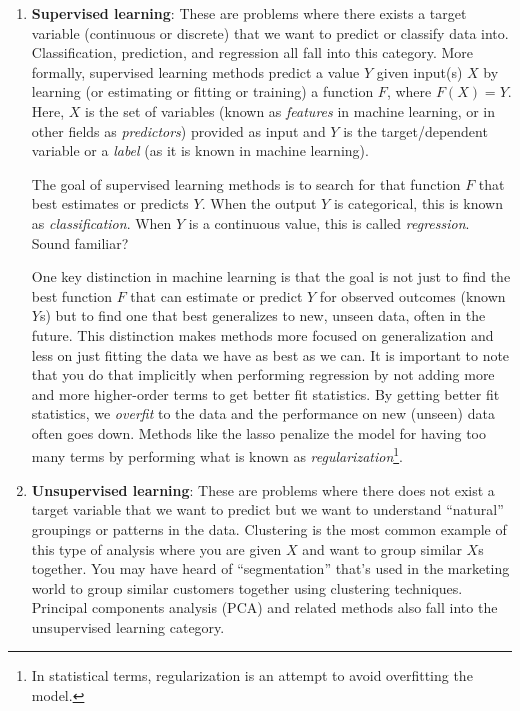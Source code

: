 \documentclass[]{krantz}
\begin{document}
\begin{enumerate}
\def\labelenumi{\arabic{enumi}.}
\item
  \textbf{Supervised learning}: These are problems where there exists a
  target variable (continuous or discrete) that we want to predict or
  classify data into. Classification, prediction, and regression all
  fall into this category. More formally, supervised learning methods
  predict a value \(Y\) given input(s) \(X\) by learning (or estimating
  or fitting or training) a function \(F\), where \(F(X) = Y\). Here,
  \(X\) is the set of variables (known as \emph{features} in machine
  learning, or in other fields as \emph{predictors}) provided as input
  and \(Y\) is the target/dependent variable or a \emph{label} (as it is
  known in machine learning).

  The goal of supervised learning methods is to search for that function
  \(F\) that best estimates or predicts \(Y\). When the output \(Y\) is
  categorical, this is known as \emph{classification}. When \(Y\) is a
  continuous value, this is called \emph{regression}. Sound familiar?

  One key distinction in machine learning is that the goal is not just
  to find the best function \(F\) that can estimate or predict \(Y\) for
  observed outcomes (known \(Y\)s) but to find one that best generalizes
  to new, unseen data, often in the future. This distinction makes
  methods more focused on generalization and less on just fitting the
  data we have as best as we can. It is important to note that you do
  that implicitly when performing regression by not adding more and more
  higher-order terms to get better fit statistics. By getting better fit
  statistics, we \emph{overfit} to the data and the performance on new
  (unseen) data often goes down. Methods like the lasso
  \citep{tibshirani1996regression} penalize the model for having too
  many terms by performing what is known as
  \emph{regularization}\footnote{In statistical terms, regularization is
    an attempt to avoid overfitting the model.}.
\item
  \textbf{Unsupervised learning}: These are problems where there does
  not exist a target variable that we want to predict but we want to
  understand ``natural'' groupings or patterns in the data. Clustering
  is the most common example of this type of analysis where you are
  given \(X\) and want to group similar \(X\)s together. You may have
  heard of ``segmentation'' that's used in the marketing world to group
  similar customers together using clustering techniques. Principal
  components analysis (PCA) and related methods also fall into the
  unsupervised learning category.
\end{enumerate}
\end{document}
